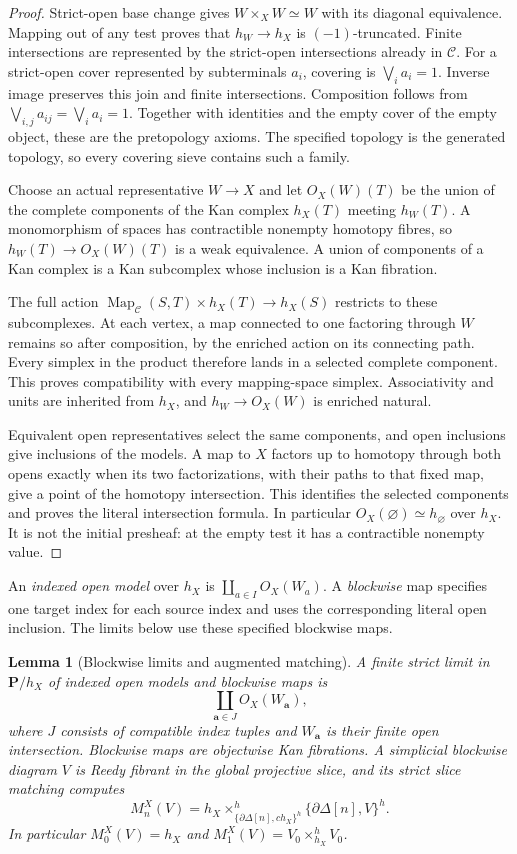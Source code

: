 \documentclass[12pt]{amsart}
\newtheorem{lem}[thm]{Lemma}
\theoremstyle{definition}
\theoremstyle{remark}
\numberwithin{equation}{section}
\DeclareMathOperator{\Map}{Map}
\begin{document}
\begin{proof}
Strict-open base change gives $W\times_X W\simeq W$
with its diagonal equivalence. Mapping out of any
test proves that $h_W\to h_X$ is $(-1)$-truncated.
Finite intersections are represented by the strict-open
intersections already in $\mathcal C$.
For a strict-open cover represented by subterminals
$a_i$, covering is $\bigvee_i a_i=1$.
Inverse image preserves this join and finite intersections.
Composition follows from
$\bigvee_{i,j}a_{ij}=\bigvee_i a_i=1$.
Together with identities and the empty cover of the
empty object, these are the pretopology axioms.
The specified topology is the generated topology,
so every covering sieve contains such a family.

Choose an actual representative $W\to X$ and let
$O_X(W)(T)$ be the union of the complete components
of the Kan complex $h_X(T)$ meeting $h_W(T)$.
A monomorphism of spaces has contractible nonempty
homotopy fibres, so $h_W(T)\to O_X(W)(T)$ is a
weak equivalence. A union of components of a Kan
complex is a Kan subcomplex whose inclusion is a
Kan fibration.

The full action
$\Map_{\mathcal C}(S,T)\times h_X(T)\to h_X(S)$
restricts to these subcomplexes. At each vertex,
a map connected to one factoring through $W$
remains so after composition, by the enriched action
on its connecting path. Every simplex in the product
therefore lands in a selected complete component.
This proves compatibility with every mapping-space
simplex.
Associativity and units are inherited from $h_X$,
and $h_W\to O_X(W)$ is enriched natural.

Equivalent open representatives select the same
components, and open inclusions give inclusions of
the models. A map to $X$ factors up to homotopy
through both opens exactly when its two factorizations,
with their paths to that fixed map, give a point of
the homotopy intersection. This identifies the
selected components and proves the literal intersection
formula. In particular
$O_X(\varnothing)\simeq h_\varnothing$ over $h_X$.
It is not the initial presheaf: at the empty test
it has a contractible nonempty value.
\end{proof}

An \emph{indexed open model} over $h_X$ is
$\coprod_{a\in I}O_X(W_a)$.
A \emph{blockwise} map specifies one target index
for each source index and uses the corresponding
literal open inclusion. The limits below use these
specified blockwise maps.

\begin{lem}[Blockwise limits and augmented matching]
A finite strict limit in $\mathbf P/h_X$ of indexed
open models and blockwise maps is
\[
 \coprod_{\mathbf a\in J}O_X(W_{\mathbf a}),
\]
where $J$ consists of compatible index tuples and
$W_{\mathbf a}$ is their finite open intersection.
\label{lem:banach-open-slice-matching}
Blockwise maps are objectwise Kan fibrations.
A simplicial blockwise diagram $V$ is Reedy fibrant
in the global projective slice, and its strict
slice matching computes
\[
 M_n^X(V)=
 h_X\times^h_{\{\partial\Delta[n],c h_X\}^{h}}
                    \{\partial\Delta[n],V\}^{h}.
\]
In particular $M_0^X(V)=h_X$ and
$M_1^X(V)=V_0\times^h_{h_X}V_0$.
\end{lem}
\end{document}
